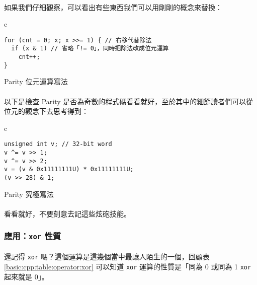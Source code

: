 \documentclass[12pt,a4paper,oneside]{article}
\begin{document}
\begin{CJK}{UTF8}{bkai}
\paragraph{}如果我們仔細觀察，可以看出有些東西我們可以用剛剛的概念來替換：

\begin{code}[h!]
\centering
\begin{tabular}{c}
\begin{lstlisting}
for (cnt = 0; x; x >>= 1) { // 右移代替除法
  if (x & 1) // 省略「!= 0」，同時把除法改成位元運算
    cnt++;
}
\end{lstlisting}
\end{tabular}
\caption{Parity 位元運算寫法}
\label{basic:cpp:code:parity:bitwise}
\end{code}

\paragraph{}以下是檢查 Parity 是否為奇數的程式碼看看就好，至於其中的細節讀者們可以從位元的觀念下去思考得到：

\begin{code}[h!]
\centering
\begin{tabular}{c}
\begin{lstlisting}
unsigned int v; // 32-bit word
v ^= v >> 1;
v ^= v >> 2;
v = (v & 0x11111111U) * 0x11111111U;
(v >> 28) & 1;
\end{lstlisting}
\end{tabular}
\caption{Parity 究極寫法}
\label{basic:cpp:code:parity:power}
\end{code}

\paragraph{}看看就好，不要刻意去記這些炫砲技能。

\subsubsection{應用：\texttt{xor} 性質}

\paragraph{}還記得 \texttt{xor} 嗎？這個運算是這幾個當中最讓人陌生的一個，回顧表 \ref{basic:cpp:table:operator:xor} 可以知道 \texttt{xor} 運算的性質是「同為 0 或同為 1 \texttt{xor} 起來就是 0」。


\end{CJK}
\end{document}
